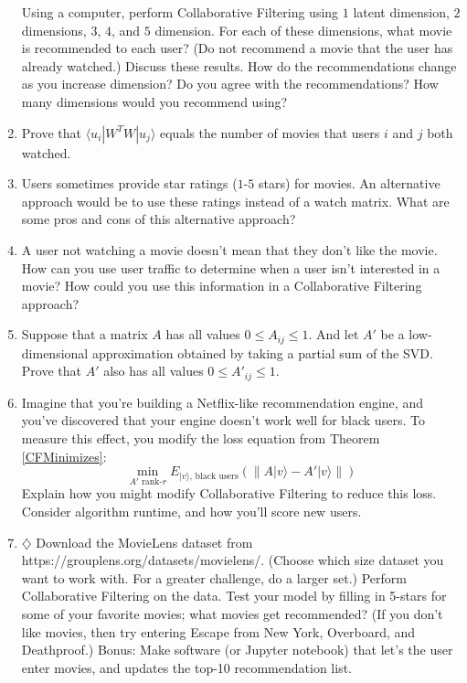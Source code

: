 \documentclass{amsbook}
\begin{document}
\begin{enumerate}
Using a computer, perform Collaborative Filtering using $1$ latent dimension, $2$ dimensions, $3$, $4$, and $5$ dimension.  For each of these dimensions, what movie is recommended to each user?  (Do not recommend a movie that the user has already watched.)  Discuss these results.  How do the recommendations change as you increase dimension?  Do you agree with the recommendations?  How many dimensions would you recommend using?
\item Prove that $\langle u_i|W^TW|u_j\rangle$ equals the number of movies that users $i$ and $j$ both watched.
\item Users sometimes provide star ratings ($1$-$5$ stars) for movies.  An alternative approach would be to use these ratings instead of a watch matrix.  What are some pros and cons of this alternative approach?
\item A user not watching a movie doesn't mean that they don't like the movie.  How can you use user traffic to determine when a user isn't interested in a movie?  How could you use this information in a Collaborative Filtering approach?
\item Suppose that a matrix $A$ has all values $0\leq A_{ij}\leq1$.  And let $A'$ be a low-dimensional approximation obtained by taking a partial sum of the SVD.  Prove that $A'$ also has all values $0\leq A'_{ij}\leq1$.
\item Imagine that you're building a Netflix-like recommendation engine, and you've discovered that your engine doesn't work well for black users.  To measure this effect, you modify the loss equation from Theorem \ref{CFMinimizes}:
$$
\min_{A'\text{ rank-$r$}}E_{|v\rangle\text{, black users}}\left(\left\|A|v\rangle-A'|v\rangle\right\|\right)
$$
Explain how you might modify Collaborative Filtering to reduce this loss.  Consider algorithm runtime, and how you'll score new users.
\item \label{Ex-MovieLens} $\diamondsuit$ Download the MovieLens dataset from https://grouplens.org/datasets/movielens/.  (Choose which size dataset you want to work with.  For a greater challenge, do a larger set.)  Perform Collaborative Filtering on the data.  Test your model by filling in 5-stars for some of your favorite movies; what movies get recommended?  (If you don’t like movies, then try entering Escape from New York, Overboard, and Deathproof.)  Bonus:  Make software (or Jupyter notebook) that let’s the user enter movies, and updates the top-10 recommendation list.
\end{enumerate}
\end{document}
